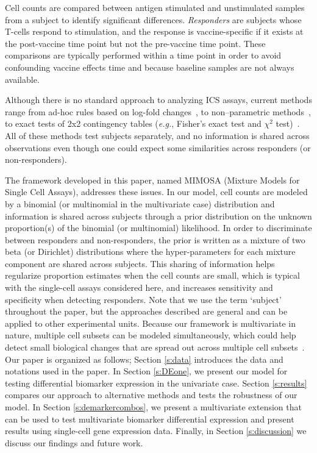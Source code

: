 \documentclass[12pt,oupdraft]{biostatistics}
\begin{document}
Cell counts are compared between antigen stimulated and unstimulated samples from a subject to identify significant differences. \emph{Responders} are subjects whose T-cells respond to stimulation, and the response is vaccine-specific if it exists at the post-vaccine time point but not the pre-vaccine time point.
These comparisons are typically performed within a time point in order to avoid confounding vaccine effects time and because baseline samples are not always available. 

Although there is no standard approach to analyzing ICS assays, current methods range from ad-hoc rules based on log-fold changes~\citep{Trigona:2003}, to non--parametric methods~\citep{Sinclair:2004hs}, to exact tests of 2x2 contingency tables (\textit{e.g.}, Fisher's exact test and $\chi^2$ test)~\citep{Horton:2007tsa,Proschan:2009ks,Peiperl:2010ej,Nason:2006dx}.
All of these methods test subjects separately, and no information is shared across observations even though one could expect some similarities across responders (or non-responders).

The framework developed in this paper, named MIMOSA (Mixture Models for Single Cell Assays), addresses these issues. In our model, cell counts are modeled by a binomial (or multinomial in the multivariate case) distribution and information is shared across subjects through a prior distribution on the unknown proportion(s) of the binomial (or multinomial) likelihood.
In order to discriminate between responders and non-responders, the prior is written as a mixture of two beta (or Dirichlet) distributions where the hyper-parameters for each mixture component are shared across subjects.
This sharing of information helps regularize proportion estimates when the cell counts are small, which is typical with the single-cell assays considered here, and increases sensitivity and specificity when detecting responders. Note that we use the term `subject' throughout the paper, but the approaches described are general and can be applied to other experimental units.
Because our framework is multivariate in nature, multiple cell subsets can be modeled simultaneously, which could help detect small biological changes that are spread out across multiple cell subsets~\citep{Nason:2006dx}. Our paper is organized as follows; Section \ref{s:data} introduces the data and notations used in the paper. In Section \ref{s:DEone}, we present our model for testing differential biomarker expression in the univariate case. Section \ref{s:results} compares our approach to alternative methods and tests the robustness of our model. In Section \ref{s:demarkercombos}, we present a multivariate extension that can be used to test multivariate biomarker differential expression and present results using single-cell gene expression data. Finally, in Section \ref{s:discussion} we discuss our findings and future work.
\end{document}
